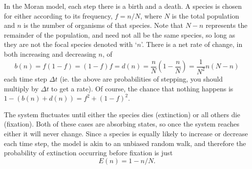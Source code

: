 \documentclass[a4paper,11pt]{article}
\numberwithin{equation}{section} %
\begin{document}
In the Moran model, each step there is a birth and a death. 
A species is chosen for either according to its frequency, $f=n/N$, where $N$ is the total population and $n$ is the number of organisms of that species. Note that $N-n$ represents the remainder of the population, and need not all be the same species, so long as they are not the focal species denoted with `$n$'. 
There is a net rate of change, in both increasing and decreasing $n$, of
\begin{equation}
b(n) = f(1-f) = (1-f)f = d(n) = \frac{n}{N}\left(1-\frac{n}{N}\right) = \frac{1}{N^2}n(N-n)
\end{equation}
each time step $\Delta t$ (ie. the above are probabilities of stepping, you should multiply by $\Delta t$ to get a rate). 
Of course, the chance that nothing happens is $1-\left(b(n)+d(n)\right) = f^2 + (1-f)^2$. 

The system fluctuates until either the species dies (extinction) or all others die (fixation). 
Both of these cases are absorbing states, so once the system reaches either it will never change. 
Since a species is equally likely to increase or decrease each time step, the model is akin to an unbiased random walk, and therefore the probability of extinction occurring before fixation is just
\begin{equation}
E(n) = 1-n/N. 
\end{equation}
\end{document}

